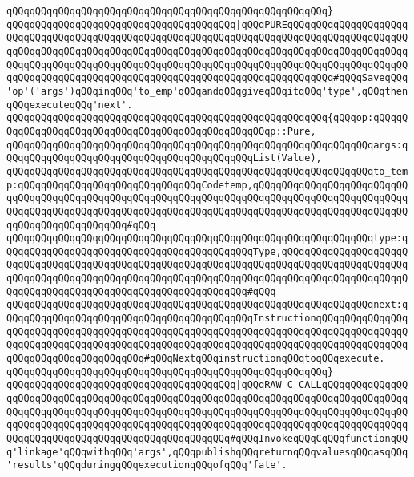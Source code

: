 \verb|qQQqqQQqqQQqqQQqqQQqqQQqqQQqqQQqqQQqqQQqqQQqqQQqqQQqqQQq}|\newline
\newline
\verb|qQQqqQQqqQQqqQQqqQQqqQQqqQQqqQQqqQQqqQQq|\verb#|qQQqPUREqQQqqQQqqQQqqQQqqQQqqQQqqQQqqQQqqQQqqQQqqQQqqQQqqQQqqQQqqQQqqQQqqQQqqQQqqQQqqQQqqQQqqQQqqQQqqQQqqQQqqQQqqQQqqQQqqQQqqQQqqQQqqQQqqQQqqQQqqQQqqQQqqQQqqQQqqQQqqQQqqQQqqQQqqQQqqQQqqQQqqQQqqQQqqQQqqQQqqQQqqQQqqQQqqQQqqQQqqQQqqQQqqQQqqQQqqQQqqQQqqQQqqQQqqQQqqQQqqQQqqQQqqQQqqQQqqQQqqQQqqQQqqQQq#\verb|#qQQqSaveqQQq'op'('args')qQQqinqQQq'to_emp'qQQqandqQQqgiveqQQqitqQQq'type',qQQqthenqQQqexecuteqQQq'next'.|\newline
\verb|qQQqqQQqqQQqqQQqqQQqqQQqqQQqqQQqqQQqqQQqqQQqqQQqqQQqqQQq{qQQqop:qQQqqQQqqQQqqQQqqQQqqQQqqQQqqQQqqQQqqQQqqQQqqQQqqQQqp::Pure,|\newline
\verb|qQQqqQQqqQQqqQQqqQQqqQQqqQQqqQQqqQQqqQQqqQQqqQQqqQQqqQQqqQQqqQQqargs:qQQqqQQqqQQqqQQqqQQqqQQqqQQqqQQqqQQqqQQqqQQqList(Value),|\newline
\verb|qQQqqQQqqQQqqQQqqQQqqQQqqQQqqQQqqQQqqQQqqQQqqQQqqQQqqQQqqQQqqQQqto_temp:qQQqqQQqqQQqqQQqqQQqqQQqqQQqqQQqCodetemp,qQQqqQQqqQQqqQQqqQQqqQQqqQQqqQQqqQQqqQQqqQQqqQQqqQQqqQQqqQQqqQQqqQQqqQQqqQQqqQQqqQQqqQQqqQQqqQQqqQQqqQQqqQQqqQQqqQQqqQQqqQQqqQQqqQQqqQQqqQQqqQQqqQQqqQQqqQQqqQQqqQQqqQQqqQQqqQQqqQQqqQQqqQQq#qQQq|\newline
\verb|qQQqqQQqqQQqqQQqqQQqqQQqqQQqqQQqqQQqqQQqqQQqqQQqqQQqqQQqqQQqqQQqtype:qQQqqQQqqQQqqQQqqQQqqQQqqQQqqQQqqQQqqQQqqQQqType,qQQqqQQqqQQqqQQqqQQqqQQqqQQqqQQqqQQqqQQqqQQqqQQqqQQqqQQqqQQqqQQqqQQqqQQqqQQqqQQqqQQqqQQqqQQqqQQqqQQqqQQqqQQqqQQqqQQqqQQqqQQqqQQqqQQqqQQqqQQqqQQqqQQqqQQqqQQqqQQqqQQqqQQqqQQqqQQqqQQqqQQqqQQqqQQqqQQqqQQqqQQq#qQQq|\newline
\verb|qQQqqQQqqQQqqQQqqQQqqQQqqQQqqQQqqQQqqQQqqQQqqQQqqQQqqQQqqQQqqQQqnext:qQQqqQQqqQQqqQQqqQQqqQQqqQQqqQQqqQQqqQQqqQQqInstructionqQQqqQQqqQQqqQQqqQQqqQQqqQQqqQQqqQQqqQQqqQQqqQQqqQQqqQQqqQQqqQQqqQQqqQQqqQQqqQQqqQQqqQQqqQQqqQQqqQQqqQQqqQQqqQQqqQQqqQQqqQQqqQQqqQQqqQQqqQQqqQQqqQQqqQQqqQQqqQQqqQQqqQQqqQQqqQQqqQQq#qQQqNextqQQqinstructionqQQqtoqQQqexecute.|\newline
\verb|qQQqqQQqqQQqqQQqqQQqqQQqqQQqqQQqqQQqqQQqqQQqqQQqqQQqqQQq}|\newline
\newline
\verb|qQQqqQQqqQQqqQQqqQQqqQQqqQQqqQQqqQQqqQQq|\verb#|qQQqRAW_C_CALLqQQqqQQqqQQqqQQqqQQqqQQqqQQqqQQqqQQqqQQqqQQqqQQqqQQqqQQqqQQqqQQqqQQqqQQqqQQqqQQqqQQqqQQqqQQqqQQqqQQqqQQqqQQqqQQqqQQqqQQqqQQqqQQqqQQqqQQqqQQqqQQqqQQqqQQqqQQqqQQqqQQqqQQqqQQqqQQqqQQqqQQqqQQqqQQqqQQqqQQqqQQqqQQqqQQqqQQqqQQqqQQqqQQqqQQqqQQqqQQqqQQqqQQqqQQqqQQqqQQqqQQq#\verb|#qQQqInvokeqQQqCqQQqfunctionqQQq'linkage'qQQqwithqQQq'args',qQQqpublishqQQqreturnqQQqvaluesqQQqasqQQq'results'qQQqduringqQQqexecutionqQQqofqQQq'fate'.|\newline
